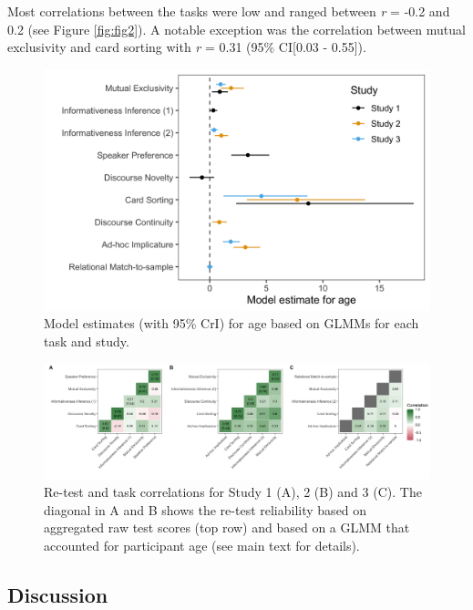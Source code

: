 \documentclass[
  english,
  man,floatsintext]{apa6}
\begin{document}
Most correlations between the tasks were low and ranged between \emph{r} = -0.2 and 0.2 (see Figure \ref{fig:fig2}). A notable exception was the correlation between mutual exclusivity and card sorting with \emph{r} = 0.31 (95\% CI{[}0.03 - 0.55{]}).



\begin{figure}

{\centering \includegraphics[width=0.6\linewidth]{./figures/figure3} 

}

\caption{Model estimates (with 95\% CrI) for age based on GLMMs for each task and study.}\label{fig:fig3}
\end{figure}



\begin{figure}

{\centering \includegraphics[width=1\linewidth]{./figures/figure4} 

}

\caption{Re-test and task correlations for Study 1 (A), 2 (B) and 3 (C). The diagonal in A and B shows the re-test reliability based on aggregated raw test scores (top row) and based on a GLMM that accounted for participant age (see main text for details).}\label{fig:fig4}
\end{figure}

\hypertarget{discussion}{%
\subsection{Discussion}\label{discussion}}
\end{document}
